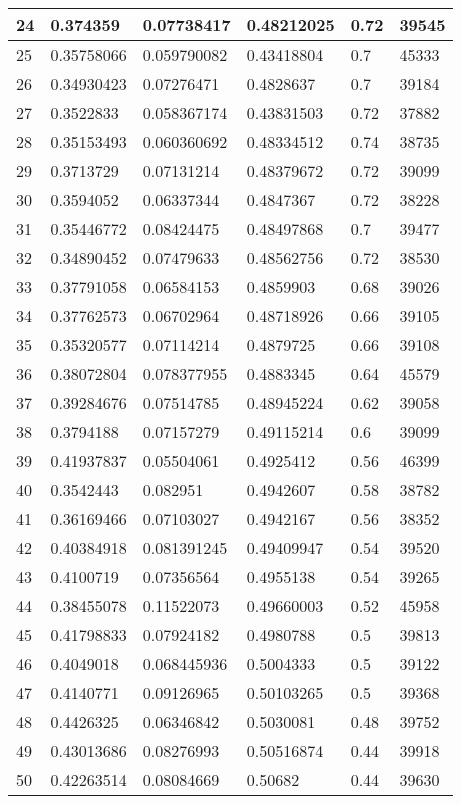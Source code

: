 \begin{longtable}{|l|l|l|l|l|l|}
24 & 0.374359 & 0.07738417 & 0.48212025 & 0.72 & 39545 \\ \hline 
25 & 0.35758066 & 0.059790082 & 0.43418804 & 0.7 & 45333 \\ \hline 
26 & 0.34930423 & 0.07276471 & 0.4828637 & 0.7 & 39184 \\ \hline 
27 & 0.3522833 & 0.058367174 & 0.43831503 & 0.72 & 37882 \\ \hline 
28 & 0.35153493 & 0.060360692 & 0.48334512 & 0.74 & 38735 \\ \hline 
29 & 0.3713729 & 0.07131214 & 0.48379672 & 0.72 & 39099 \\ \hline 
30 & 0.3594052 & 0.06337344 & 0.4847367 & 0.72 & 38228 \\ \hline 
31 & 0.35446772 & 0.08424475 & 0.48497868 & 0.7 & 39477 \\ \hline 
32 & 0.34890452 & 0.07479633 & 0.48562756 & 0.72 & 38530 \\ \hline 
33 & 0.37791058 & 0.06584153 & 0.4859903 & 0.68 & 39026 \\ \hline 
34 & 0.37762573 & 0.06702964 & 0.48718926 & 0.66 & 39105 \\ \hline 
35 & 0.35320577 & 0.07114214 & 0.4879725 & 0.66 & 39108 \\ \hline 
36 & 0.38072804 & 0.078377955 & 0.4883345 & 0.64 & 45579 \\ \hline 
37 & 0.39284676 & 0.07514785 & 0.48945224 & 0.62 & 39058 \\ \hline 
38 & 0.3794188 & 0.07157279 & 0.49115214 & 0.6 & 39099 \\ \hline 
39 & 0.41937837 & 0.05504061 & 0.4925412 & 0.56 & 46399 \\ \hline 
40 & 0.3542443 & 0.082951 & 0.4942607 & 0.58 & 38782 \\ \hline 
41 & 0.36169466 & 0.07103027 & 0.4942167 & 0.56 & 38352 \\ \hline 
42 & 0.40384918 & 0.081391245 & 0.49409947 & 0.54 & 39520 \\ \hline 
43 & 0.4100719 & 0.07356564 & 0.4955138 & 0.54 & 39265 \\ \hline 
44 & 0.38455078 & 0.11522073 & 0.49660003 & 0.52 & 45958 \\ \hline 
45 & 0.41798833 & 0.07924182 & 0.4980788 & 0.5 & 39813 \\ \hline 
46 & 0.4049018 & 0.068445936 & 0.5004333 & 0.5 & 39122 \\ \hline 
47 & 0.4140771 & 0.09126965 & 0.50103265 & 0.5 & 39368 \\ \hline 
48 & 0.4426325 & 0.06346842 & 0.5030081 & 0.48 & 39752 \\ \hline 
49 & 0.43013686 & 0.08276993 & 0.50516874 & 0.44 & 39918 \\ \hline 
50 & 0.42263514 & 0.08084669 & 0.50682 & 0.44 & 39630 \\ \hline 
\end{longtable}